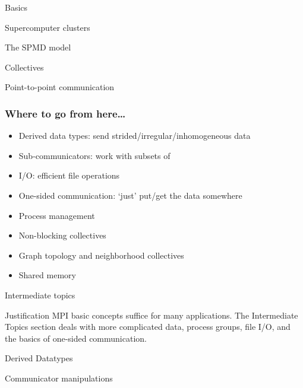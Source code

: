 \documentclass[10pt]{beamer}
\begin{document}
 {Basics}

\renewcommand\standardversion{3}

 {Supercomputer clusters}


{} {The SPMD model}
\label{sec:spmd}


{} {Collectives}
\label{sec:collectives}


{} {Point-to-point communication}
\label{sec:ptp}


\iffalse
\begin{exerciseframe}[serialsend]
  
\end{exerciseframe}
\fi

\begin{frame}[containsverbatim]\frametitle{Where to go from here\ldots}
  \begin{itemize}
  \item Derived data types: send strided/irregular/inhomogeneous data
  \item Sub-communicators: work with subsets of 
  \item I/O: efficient file operations
  \item One-sided communication: `just' put/get the data somewhere
  \item Process management
  \item Non-blocking collectives
  \item Graph topology and neighborhood collectives
  \item Shared memory
  \end{itemize}
\end{frame}

\renewcommand\standardversion{}

{} {Intermediate topics}

\begin{frame}{Justification}
  MPI basic concepts suffice for many applications.  The Intermediate
  Topics section deals with more complicated data, process groups,
  file I/O, and the basics of one-sided communication.
\end{frame}

{} {Derived Datatypes}
\label{sec:derived}


{} {Communicator manipulations}
\label{sec:comm}

\end{document}
